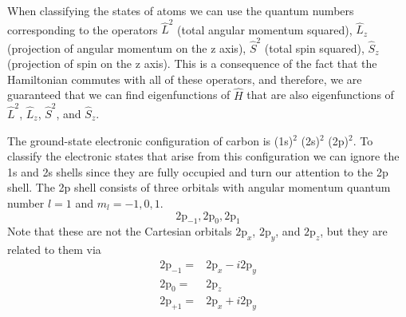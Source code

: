 \documentclass[../Main/chem532-notes.tex]{subfiles}
\begin{document}
\begin{example}
When classifying the states of atoms we can use the quantum numbers corresponding to the operators $\hat{L}^2$ (total angular momentum squared), $\hat{L}_z$ (projection of angular momentum on the z axis), $\hat{S}^2$ (total spin squared), $\hat{S}_z$ (projection of spin on the z axis).
This is a consequence of the fact that the Hamiltonian commutes with all of these operators, and therefore, we are guaranteed that we can find eigenfunctions of $\hat{H}$ that are also eigenfunctions of $\hat{L}^2$, $\hat{L}_z$, $\hat{S}^2$, and $\hat{S}_z$.


The ground-state electronic configuration of carbon is (1s)$^2$ (2s)$^2$ (2p)$^2$.
To classify the electronic states that arise from this configuration we can ignore the 1s and 2s shells since they are fully occupied and turn our attention to the 2p shell.
The 2p shell consists of three orbitals with angular momentum quantum number $l = 1$ and $m_l= -1,0,1$.
\begin{equation}
2\mathrm{p}_{-1}, 2\mathrm{p}_{0}, 2\mathrm{p}_{1}
\end{equation}
Note that these are not the Cartesian orbitals $\mathrm{2p}_{x}$, $\mathrm{2p}_{y}$, and $\mathrm{2p}_{z}$, but they are related to them via
\begin{equation}
\begin{split}
\mathrm{2p}_{-1} = &  \mathrm{2p}_{x} - i \mathrm{2p}_{y} \\
\mathrm{2p}_{0} = & \mathrm{2p}_{z} \\
\mathrm{2p}_{+1} = & \mathrm{2p}_{x} + i \mathrm{2p}_{y}
\end{split}
\end{equation}



\end{example}
\end{document}
